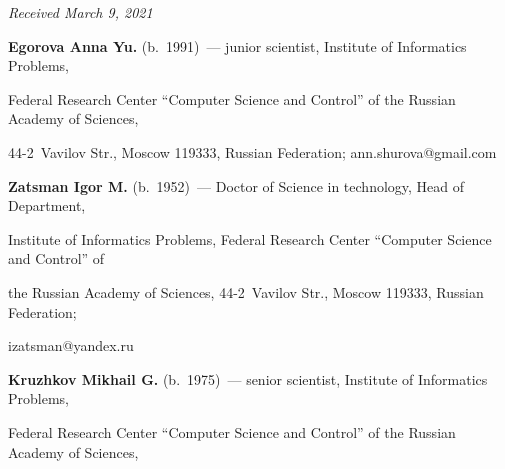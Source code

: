 \vspace*{-3pt}





\hfill{\small\textit{Received March 9, 2021}} 





\vspace*{-14pt} 





\Contr





\vspace*{-4pt}





\noindent


\textbf{Egorova Anna Yu.} (b.\ 1991)~--- junior scientist, Institute of Informatics Problems, 


Federal Research Center ``Computer Science and Control'' of the Russian Academy of Sciences, 


44-2~Vavilov Str., Moscow 119333, Russian Federation; \mbox{ann.shurova@gmail.com}





\vspace*{1pt}





\noindent


\textbf{Zatsman Igor M.} (b.\ 1952)~--- Doctor of Science in technology, Head of Department, 


Institute of Informatics Problems, Federal Research Center ``Computer Science and Control'' of 


the Russian Academy of Sciences, 44-2~Vavilov Str., Moscow 119333, Russian Federation; 


\mbox{izatsman@yandex.ru}





\vspace*{1pt}





\noindent


\textbf{Kruzhkov Mikhail G.} (b.\ 1975)~--- senior scientist, Institute of Informatics Problems, 


Federal Research Center ``Computer Science and Control'' of the Russian Academy of Sciences, 


